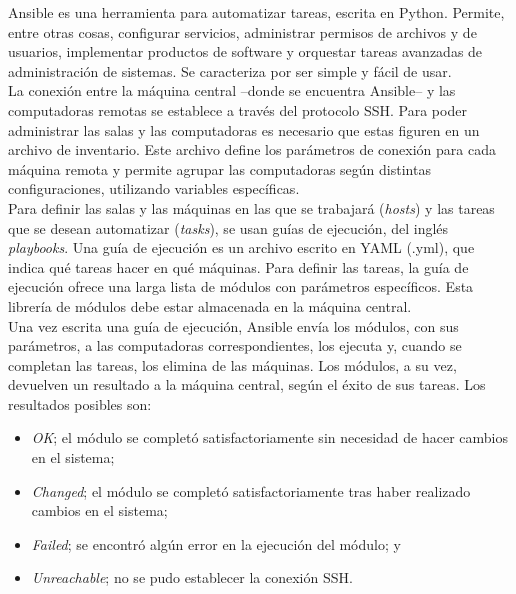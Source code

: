 \documentclass[a4paper,12pt]{article}
\begin{document}
Ansible es una herramienta para automatizar tareas, escrita en Python. Permite, entre otras cosas, configurar servicios, administrar permisos de archivos y de usuarios, implementar productos de software y orquestar tareas avanzadas de administración de sistemas. Se caracteriza por ser simple y fácil de usar.\\

La conexión entre la máquina central --donde se encuentra Ansible-- y las computadoras remotas se establece a través del protocolo SSH. Para poder administrar las salas y las computadoras es necesario que estas figuren en un archivo de inventario. Este archivo define los parámetros de conexión para cada máquina remota y permite agrupar las computadoras según distintas configuraciones, utilizando variables específicas.\\

Para definir las salas y las máquinas en las que se trabajará (\emph{hosts}) y las tareas que se desean automatizar (\emph{tasks}), se usan guías de ejecución, del inglés \emph{playbooks}. Una guía de ejecución es un archivo escrito en YAML (.yml), que indica qué tareas hacer en qué máquinas. Para definir las tareas, la guía de ejecución ofrece una larga lista de módulos con parámetros específicos. Esta librería de módulos debe estar almacenada en la máquina central.\\

Una vez escrita una guía de ejecución, Ansible envía los módulos, con sus parámetros, a las computadoras correspondientes, los ejecuta y, cuando se completan las tareas, los elimina de las máquinas. Los módulos, a su vez, devuelven un resultado a la máquina central, según el éxito de sus tareas. Los resultados posibles son:\\

\begin{itemize}
\item \emph{OK}; el módulo se completó satisfactoriamente sin necesidad de hacer cambios en el sistema;\\
\item \emph{Changed}; el módulo se completó satisfactoriamente tras haber realizado cambios en el sistema;\\
\item \emph{Failed}; se encontró algún error en la ejecución del módulo; y\\
\item \emph{Unreachable}; no se pudo establecer la conexión SSH.\\
\end{itemize}
\end{document}
